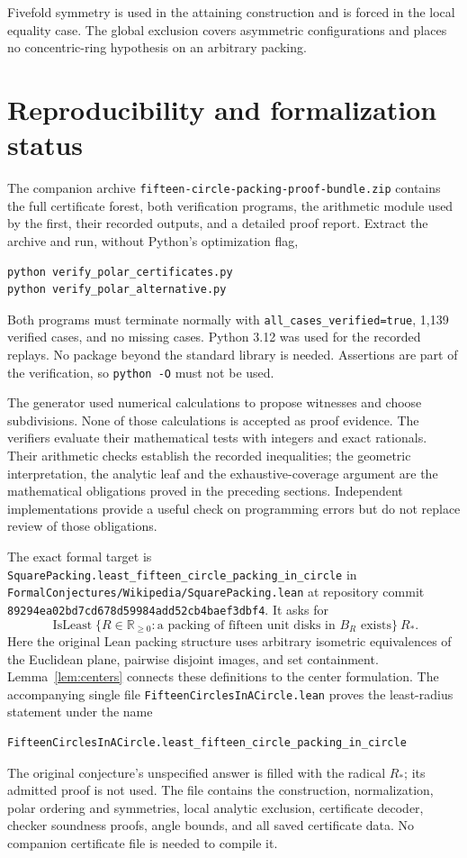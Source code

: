 \documentclass[11pt]{amsart}
\theoremstyle{definition}
\theoremstyle{remark}
\numberwithin{equation}{section}
\newcommand{\R}{\mathbb R}
\newcommand{\Ropt}{R_*}
\begin{document}
Fivefold symmetry is used in the attaining construction and is forced in
the local equality case. The global exclusion covers asymmetric
configurations and places no concentric-ring hypothesis on an arbitrary
packing.

\section{Reproducibility and formalization status}\label{sec:reproduce}

The companion archive \texttt{fifteen-circle-packing-proof-bundle.zip}
contains the full certificate forest, both verification programs, the
arithmetic module used by the first, their recorded outputs, and a detailed
proof report. Extract the archive and run, without Python's optimization
flag,
\begin{verbatim}
python verify_polar_certificates.py
python verify_polar_alternative.py
\end{verbatim}
Both programs must terminate normally with
\texttt{all\_cases\_verified=true}, 1,139 verified cases, and no missing
cases. Python 3.12 was used for the recorded replays. No package beyond the
standard library is needed. Assertions are part of the verification, so
\texttt{python -O} must not be used.

The generator used numerical calculations to propose witnesses and choose
subdivisions. None of those calculations is accepted as proof evidence.
The verifiers evaluate their mathematical tests with integers and exact
rationals. Their arithmetic checks establish the recorded inequalities;
the geometric interpretation, the analytic leaf and the exhaustive-coverage
argument are the mathematical obligations proved in the preceding sections.
Independent implementations provide a useful check on programming errors
but do not replace review of those obligations.

The exact formal target is
\texttt{SquarePacking.least\_fifteen\_circle\_packing\_in\_circle} in
\texttt{FormalConjectures/Wikipedia/SquarePacking.lean} at repository
commit \texttt{89294ea02bd7cd678d59984add52cb4baef3dbf4}. It asks for
\[
 \operatorname{IsLeast}
 \{R\in\R_{\geq0}:\text{a packing of fifteen unit disks in }B_R\text{ exists}\}
 \ \Ropt.
\]
Here the original Lean packing structure uses arbitrary isometric
equivalences of the Euclidean plane, pairwise disjoint images, and set
containment. Lemma~\ref{lem:centers} connects these definitions to the center
formulation. The accompanying single file
\texttt{FifteenCirclesInACircle.lean} proves the least-radius statement under
the name
\begin{verbatim}
FifteenCirclesInACircle.least_fifteen_circle_packing_in_circle
\end{verbatim}
The original conjecture's unspecified answer is filled with the radical
$\Ropt$; its admitted proof is not used. The file contains the construction,
normalization, polar ordering and symmetries, local analytic exclusion,
certificate decoder, checker soundness proofs, angle bounds, and all saved
certificate data. No companion certificate file is needed to compile it.
\end{document}
